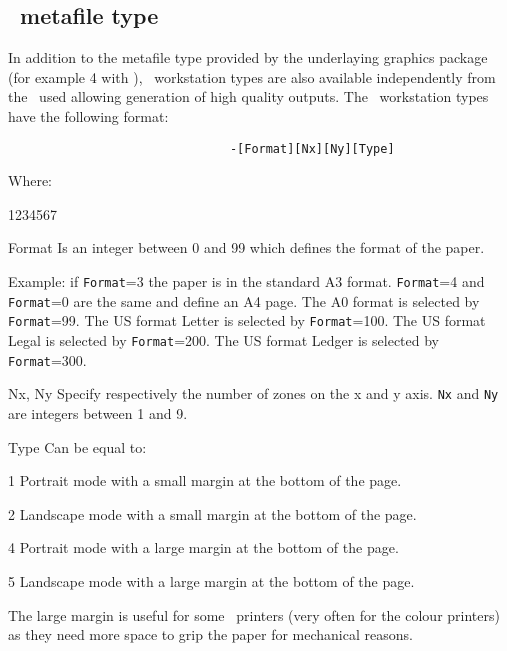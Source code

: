 \subsection{\PS~metafile type}
In addition to the metafile type provided by the underlaying graphics
package (for example 4 with \GKSGRAL), \PS~workstation types
are also available independently from the \UGP~used allowing generation of
high quality outputs. The \PS~workstation types have the following format:
\begin{verbatim}
                               -[Format][Nx][Ny][Type]
\end{verbatim}
    Where:
\begin{DLtt}{1234567}
\item[Format] Is an integer between 0 and 99 which defines the format of the
              paper. \par
 Example: if {\tt Format}=3 the pa\-per is in the standard
	      A3 format. {\tt Format}=4 and {\tt Format}=0 are the same and
	      define an A4 page. The A0 format is selected by {\tt Format}=99.
              The US format Letter is selected by {\tt Format}=100.
              The US format Legal is selected by {\tt Format}=200.
              The US format Ledger is selected by {\tt Format}=300.
\item[Nx, Ny] Specify respectively the number of zones on the x and y axis.
              {\tt Nx} and {\tt Ny} are integers between 1 and 9.
\item[Type] Can be equal to:
\begin{DLtt}{12}
\item[1] Portrait mode with a small margin at the bottom of the page.
\item[2] Landscape mode with a small margin at the bottom of the page.
\item[4] Portrait mode with a large margin at the bottom of the page.
\item[5] Landscape mode with a large margin at the bottom of the page.

         The large
         margin is useful for some \PS~printers (very often for the colour
         printers)  as they need more space to
	 grip the paper for mechanical reasons.


\end{DLtt}
\end{DLtt}
